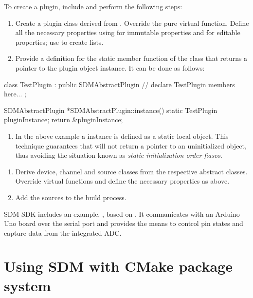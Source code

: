 \documentclass[a4paper,12pt,twoside,extrafontsizes]{memoir}
\begin{document}
To create a plugin, include  and perform the following steps:

\begin{enumerate}
	\item Create a plugin class derived from . Override the  pure virtual function. Define all the necessary properties using  for immutable properties and  for editable properties; use  to create lists.
	\item Provide a definition for the  static member function of the  class that returns a pointer to the plugin object instance. It can be done as follows:
\end{enumerate}
	
\begin{breakshellcmds}\begin{ccode}
class TestPlugin : public SDMAbstractPlugin {
// declare TestPlugin members here...
};

SDMAbstractPlugin *SDMAbstractPlugin::instance() {
    static TestPlugin pluginInstance;
    return &pluginInstance;
}
\end{ccode}\end{breakshellcmds}

\begin{enumerate}[label={}]
	\item In the above example a  instance is defined as a static local object. This technique guarantees that  will not return a pointer to an uninitialized object, thus avoiding the situation known as \emph{static initialization order fiasco}.
\end{enumerate}
\begin{enumerate}[start=3]
	\item Derive device, channel and source classes from the respective abstract classes. Override virtual functions and define the necessary properties as above.
	\item Add the  sources to the build process.
\end{enumerate}

SDM SDK includes an example, , based on . It communicates with an Arduino Uno board over the serial port and provides the means to control pin states and capture data from the integrated ADC.

\section{Using SDM with CMake package system}
\label{sec:cmakeconfig}
\end{document}
